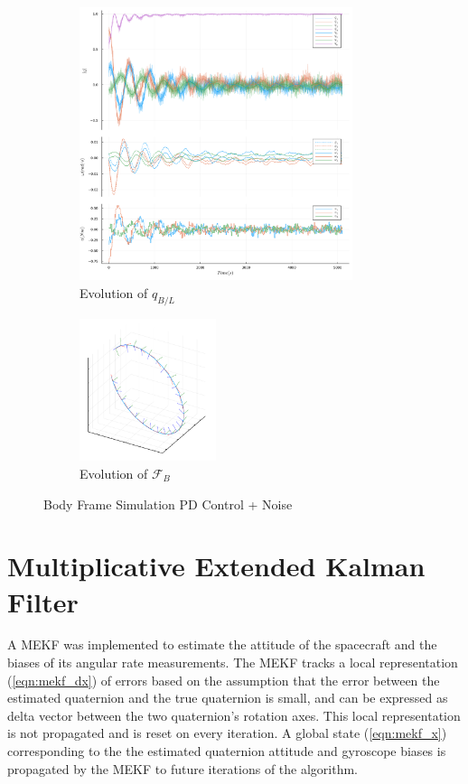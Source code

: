 \documentclass{article}
\begin{document}
\begin{figure}[H]
\centering
	\begin{subfigure}[b]{0.6\textwidth}
		\centering
		\includegraphics[width=8cm]{images/pd_noise_attitude_lvlh.png}
		\caption{Evolution of $q_{B/L}$}
		\label{fig:quat_pd_noise}
	\end{subfigure}
	\begin{subfigure}[b]{0.3\textwidth}
		\centering
		\includegraphics[width=4cm]{images/pd_noise_orbit_0s_to_5100s.png}
		\caption{Evolution of $\mathcal{F}_{B}$}
		\label{fig:orbit_pd_noise}
	\end{subfigure}
	\caption{Body Frame Simulation PD Control + Noise}
\end{figure}

\section{Multiplicative Extended Kalman Filter}

A MEKF was implemented to estimate the attitude of the spacecraft and the biases of its angular rate measurements. The MEKF tracks a local representation (\ref{eqn:mekf_dx}) of errors based on the assumption that the error between the estimated quaternion and the true quaternion is small, and can be expressed as delta vector between the two quaternion's rotation axes. This local representation is not propagated and is reset on every iteration. A global state (\ref{eqn:mekf_x}) corresponding to the the estimated quaternion attitude and gyroscope biases is propagated by the MEKF to future iterations of the algorithm.
\end{document}
